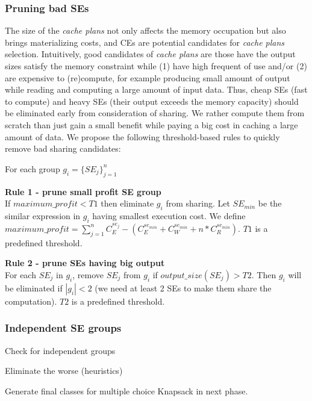 

\subsubsection{Pruning bad SEs}
\label{sec:se-prune}
The size of the \emph{cache plans} not only affects the memory occupation but also brings materializing costs, and CEs are potential candidates for \emph{cache plans} selection. Intuitively, good candidates of \emph{cache plans} are those have the output sizes satisfy the memory constraint while (1) have high frequent of use and/or (2) are expensive to (re)compute, for example producing small amount of output while reading and computing a large amount of input data. Thus, cheap SEs (fast to compute) and heavy SEs (their output exceeds the memory capacity) should be eliminated early from consideration of sharing. We rather compute them from scratch than just gain a small benefit while paying a big cost in caching a large amount of data. We propose the following threshold-based rules to quickly remove bad sharing candidates:

For each group $g_i=\{SE_j\}_{j=1}^n$

\textbf{Rule 1 - prune small profit SE group}\\
If $maximum\_profit < T1$ then eliminate $g_i$ from sharing. Let $SE_{min}$ be the similar expression in $g_i$ having smallest execution cost. We define $maximum\_profit=\sum_{j=1}^{n}C_{E}^{se_j} - (C_{E}^{se_{min}} + C_{W}^{se_{min}} + n*C_{R}^{se_{min}})$. $T1$ is a predefined threshold.

\textbf{Rule 2 - prune SEs having big output}\\
For each $SE_j$ in $g_i$, remove $SE_j$ from $g_i$ if $output\_size(SE_j) > T2$. Then $g_i$ will be eliminated if $|g_i| < 2$ (we need at least 2 SEs to make them share the computation). $T2$ is a predefined threshold.

\subsubsection{Independent SE groups}
Check for independent groups

Eliminate the worse (heuristics)

Generate final classes for multiple choice Knapsack in next phase.

